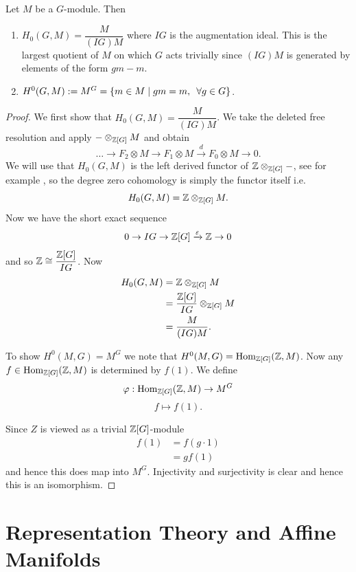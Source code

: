 \begin{prop}\label{prop:group-zero-homol-cohom}
    Let $M$ be a $G$-module. Then
    \begin{enumerate}
        \item $H_0(G,M) = \dfrac{M}{(IG)M}$ where $IG$ is the augmentation ideal. This is the largest quotient of $M$ on which $G$ acts trivially since $(IG)M$ is generated by elements of the form $gm-m$.
        \item $H^0(G,M) := M^G = \{m\in M \mid gm = m, \enskip \forall g \in G\}$.
    \end{enumerate}
\end{prop}
\begin{proof}
    We first show that $H_0(G,M) = \dfrac{M}{(IG)M}$. We take the deleted free resolution and apply $- \otimes_{\mathbb{Z}[G]} M$ and obtain
    $$
        \dots \to F_2 \otimes M \to F_1 \otimes M \xrightarrow{d} F_0 \otimes M \to 0.
    $$
    We will use that $H_0(G, M)$ is the left derived functor of $\mathbb{Z} \otimes_{\mathbb{Z}[G]} -$, see for example \cite{brown2012cohomology}, so the degree zero cohomology
    is simply the functor itself i.e.
    $$
        H_0(G, M) = \mathbb{Z} \otimes_{\mathbb{Z}[G]} M.
    $$
    Now we have the short exact sequence
    $$
        0 \to IG \to \mathbb{Z}[G] \xrightarrow{\varepsilon} \mathbb{Z} \to 0
    $$
    and so $\mathbb{Z} \cong \dfrac{\mathbb{Z}[G]}{IG}$. Now
    \begin{align*}
        H_0(G, M) & = \mathbb{Z} \otimes_{\mathbb{Z}[G]} M                \\
                  & = \dfrac{\mathbb{Z}[G]}{IG} \otimes_{\mathbb{Z}[G]} M \\
                  & = \dfrac{M}{(IG)M}.
    \end{align*}

    To show $H^0(M, G) = M^G$ we note that $H^0(M, G) = \operatorname{Hom}_{\mathbb{Z}[G]} (\mathbb{Z}, M)$. Now
    any $f \in \operatorname{Hom}_{\mathbb{Z}[G]} (\mathbb{Z}, M)$ is determined by $f(1)$. We define $$ \varphi
        : \operatorname{Hom}_{\mathbb{Z}[G]} (\mathbb{Z}, M) \to M^G $$ $$ f \mapsto f(1).$$

    Since $Z$ is viewed as a trivial $\mathbb{Z}[G]$-module
    \begin{align*}
        f(1) & =f(g\cdot 1) \\
             & = g f(1)
    \end{align*}
    and hence this does map into $M^G$. Injectivity and surjectivity is clear and hence this is an isomorphism.
\end{proof}
\section{Representation Theory and Affine Manifolds}

